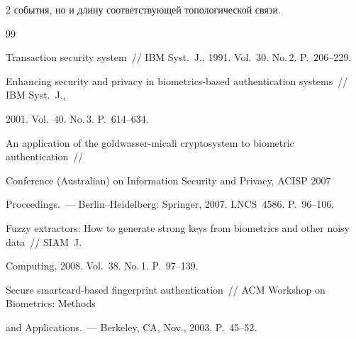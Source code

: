 \begin{multicols}{2}
события, но и длину соответствующей топологической связи. 



{\small\frenchspacing

{%


\begin{thebibliography}{99}

      



Transaction security system~// IBM Syst.~J., 1991. Vol.~30. No.\,2. P.~206--229.





Enhancing security and privacy in biometrics-based authentication systems~// IBM Syst.~J., 

2001. Vol.~40. No.\,3. P.~614--634.





An application of the goldwasser-micali cryptosystem to biometric authentication~// 

Conference (Australian) on Information Security and Privacy, ACISP 2007

Proceedings.~--- Berlin--Heidelberg: Springer,  2007. LNCS~4586. P.~96--106. 





Fuzzy extractors: How to generate strong keys from biometrics and other noisy data~// SIAM~J. 

Computing, 2008. Vol.~38. No.\,1. P.~97--139. 





Secure smartcard-based fingerprint authentication~// ACM Workshop on Biometrics: Methods 

and Applications.~--- Berkeley, CA, Nov., 2003. P.~45--52.






\end{thebibliography}}}
\end{multicols}
